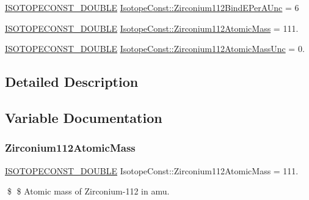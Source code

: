 \begin{DoxyCompactItemize}
\mbox{\hyperlink{group___isotope_const-_macros_ga8f45a7272ce02c0b4c65c44636ed719a}{I\+S\+O\+T\+O\+P\+E\+C\+O\+N\+S\+T\+\_\+\+D\+O\+U\+B\+LE}} \mbox{\hyperlink{group___isotope_const-_zirconium-_zr112_ga9e2c6525edfd34d4c383888317cf1ae4}{Isotope\+Const\+::\+Zirconium112\+Bind\+E\+Per\+A\+Unc}} = 6
\item 
\mbox{\hyperlink{group___isotope_const-_macros_ga8f45a7272ce02c0b4c65c44636ed719a}{I\+S\+O\+T\+O\+P\+E\+C\+O\+N\+S\+T\+\_\+\+D\+O\+U\+B\+LE}} \mbox{\hyperlink{group___isotope_const-_zirconium-_zr112_ga8fee8343bc821c67511b91c71875bc76}{Isotope\+Const\+::\+Zirconium112\+Atomic\+Mass}} = 111.
\item 
\mbox{\hyperlink{group___isotope_const-_macros_ga8f45a7272ce02c0b4c65c44636ed719a}{I\+S\+O\+T\+O\+P\+E\+C\+O\+N\+S\+T\+\_\+\+D\+O\+U\+B\+LE}} \mbox{\hyperlink{group___isotope_const-_zirconium-_zr112_ga557ff240614345bcf7caf4cde3f2d8c1}{Isotope\+Const\+::\+Zirconium112\+Atomic\+Mass\+Unc}} = 0.
\end{DoxyCompactItemize}


\subsection{Detailed Description}


\subsection{Variable Documentation}
\mbox{\label{group___isotope_const-_zirconium-_zr112_ga8fee8343bc821c67511b91c71875bc76}} 
\subsubsection{\texorpdfstring{Zirconium112\+Atomic\+Mass}{Zirconium112AtomicMass}}
{\footnotesize\ttfamily \mbox{\hyperlink{group___isotope_const-_macros_ga8f45a7272ce02c0b4c65c44636ed719a}{I\+S\+O\+T\+O\+P\+E\+C\+O\+N\+S\+T\+\_\+\+D\+O\+U\+B\+LE}} Isotope\+Const\+::\+Zirconium112\+Atomic\+Mass = 111.}

\$ \$ Atomic mass of Zirconium-\/112 in amu. \mbox{\label{group___isotope_const-_zirconium-_zr112_ga557ff240614345bcf7caf4cde3f2d8c1}} 
